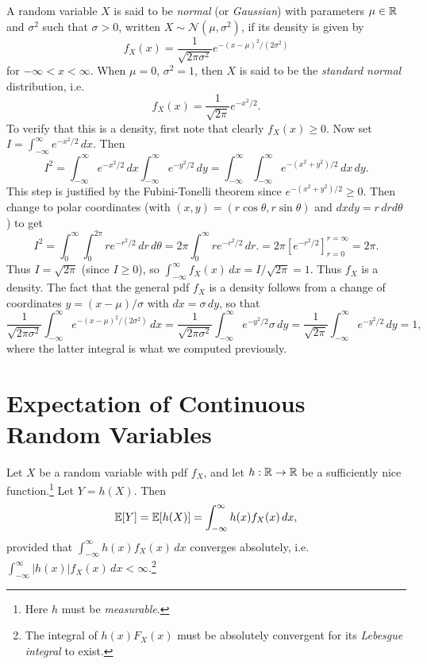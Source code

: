 \begin{example}
  A random variable $X$ is said to be \emph{normal}
  (or \emph{Gaussian}) with parameters $\mu \in \mathbb{R}$
  and $\sigma^2$ such that $\sigma > 0$, written
  $X \sim \mathcal{N}(\mu, \sigma^2)$,
  if its density is given by
  \[
    f_X(x) = \frac{1}{\sqrt{2\pi \sigma^2}} e^{-(x - \mu)^2 / (2\sigma^2)}
  \]
  for $-\infty < x < \infty$.
  When $\mu = 0$, $\sigma^2 = 1$, then $X$ is
  said to be the \emph{standard normal} distribution,
  i.e.
  \[
    f_X(x) = \frac{1}{\sqrt{2\pi}} e^{-x^2 / 2}.
  \]
  To verify that this is a density,
  first note that clearly $f_X(x) \ge 0$.
  Now set $\displaystyle I = \int_{-\infty}^\infty e^{-x^2 / 2} \, dx$.
  Then
  \[
    I^2 = \int_{-\infty}^\infty e^{-x^2 / 2} \, dx \int_{-\infty}^\infty e^{-y^2 / 2} \, dy
    = \int_{-\infty}^\infty \int_{-\infty}^\infty e^{-(x^2 + y^2) / 2} \, dx \, dy.
  \]
  This step is justified by the Fubini-Tonelli theorem
  since $e^{-(x^2 + y^2) / 2} \ge 0$. Then change
  to polar coordinates (with $(x, y) = (r\cos \theta, r \sin \theta)$ and $dx dy = r\, dr d\theta$)
  to get
  \[
    I^2 =
    \int_0^\infty
    \int_0^{2\pi}
    r e^{-r^2 / 2}
    \, dr \, d\theta
    = 2\pi \int_0^\infty r e^{-r^2 / 2} \, dr.
    = 2\pi \left[ e^{-r^2 / 2} \right]_{r = 0}^{r = \infty}
    = 2\pi.
  \]
  Thus $I = \sqrt{2\pi}$ (since $I \ge 0$), so
  $\displaystyle \int_{-\infty}^\infty f_X(x) \, dx = I / \sqrt{2\pi} = 1$. Thus $f_X$ is a density.
  The fact that the general pdf $f_X$ is a density
  follows from a change of coordinates
  $y = (x - \mu) / \sigma$ with $dx = \sigma\, dy$,
  so that
  \[
    \frac{1}{\sqrt{2\pi \sigma^2}}
    \int_{-\infty}^\infty e^{-(x - \mu)^2 / (2\sigma^2)} \, dx
    = \frac{1}{\sqrt{2\pi \sigma^2}} \int_{-\infty}^\infty
    e^{-y^2 / 2} \sigma\, dy = \frac{1}{\sqrt{2\pi}} \int_{-\infty}^\infty e^{-y^2 / 2} \, dy = 1,
  \]
  where the latter integral is what we
  computed previously.
\end{example}

\section{Expectation of Continuous Random Variables}
\begin{theorem}
  Let $X$ be a random variable with pdf $f_X$, and let
  $h : \mathbb{R} \to \mathbb{R}$ be a sufficiently nice function.\footnote{Here $h$ must be \emph{measurable}.}
  Let $Y = h(X)$. Then
  \[
    \mathbb{E}[Y] = \mathbb{E}[h(X)] = \int_{-\infty}^\infty h(x) f_X(x) \, dx,
  \]
  provided that
  $\displaystyle \int_{-\infty}^\infty h(x) f_X(x) \, dx$ converges
  absolutely, i.e.
  $\displaystyle \int_{-\infty}^\infty |h(x)| f_X(x) \, dx < \infty$.\footnote{The integral of $h(x) F_X(x)$ must be absolutely convergent for its \emph{Lebesgue integral} to exist.}
\end{theorem}

